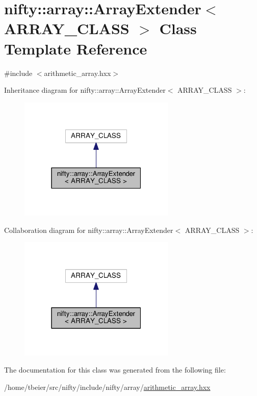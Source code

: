 \hypertarget{classnifty_1_1array_1_1ArrayExtender}{}\section{nifty\+:\+:array\+:\+:Array\+Extender$<$ A\+R\+R\+A\+Y\+\_\+\+C\+L\+A\+S\+S $>$ Class Template Reference}
\label{classnifty_1_1array_1_1ArrayExtender}


{\ttfamily \#include $<$arithmetic\+\_\+array.\+hxx$>$}



Inheritance diagram for nifty\+:\+:array\+:\+:Array\+Extender$<$ A\+R\+R\+A\+Y\+\_\+\+C\+L\+A\+S\+S $>$\+:\nopagebreak
\begin{figure}[H]
\begin{center}
\leavevmode
\includegraphics[width=211pt]{classnifty_1_1array_1_1ArrayExtender__inherit__graph}
\end{center}
\end{figure}


Collaboration diagram for nifty\+:\+:array\+:\+:Array\+Extender$<$ A\+R\+R\+A\+Y\+\_\+\+C\+L\+A\+S\+S $>$\+:\nopagebreak
\begin{figure}[H]
\begin{center}
\leavevmode
\includegraphics[width=211pt]{classnifty_1_1array_1_1ArrayExtender__coll__graph}
\end{center}
\end{figure}


The documentation for this class was generated from the following file\+:\begin{DoxyCompactItemize}
\item 
/home/tbeier/src/nifty/include/nifty/array/\hyperlink{arithmetic__array_8hxx}{arithmetic\+\_\+array.\+hxx}\end{DoxyCompactItemize}
